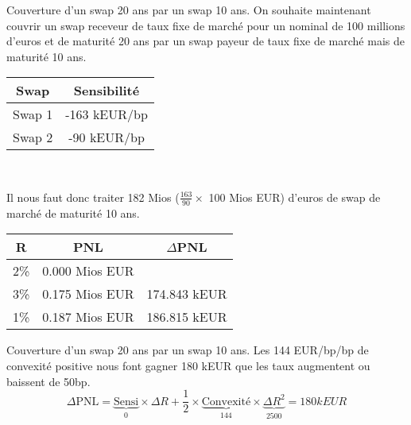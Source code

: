 \documentclass{beamer}
\begin{document}
\begin{frame}{Couverture d'un swap 20 ans par un swap 10 ans.}
On souhaite maintenant couvrir un swap receveur de taux fixe de marché pour un nominal de 100 millions d'euros et de maturité 20 ans par un swap payeur de taux fixe de marché mais de maturité 10 ans.\\
\begin{center}
\begin{tabular}{|c|c|}
\hline
Swap&Sensibilité \\ 
\hline
Swap 1 &-163 kEUR/bp \\ 
Swap 2 &-90 kEUR/bp \\ 
\hline
\end{tabular}\\
\end{center}
Il nous faut donc traiter 182 Mios ($\frac{163}{90} \times$ 100 Mios EUR)  d'euros de swap de marché de maturité 10 ans.
\begin{center}
\begin{tabular}{|c|c|c|}
\hline
R&PNL&$\Delta$PNL \\
\hline
2\% &0.000 Mios EUR& \\ 
3\% &0.175 Mios EUR&174.843 kEUR\\
1\% &0.187 Mios EUR&186.815 kEUR\\
\hline
\end{tabular}
\end{center}
\end{frame}
\begin{frame}{Couverture d'un swap 20 ans par un swap 10 ans.}
Les 144 EUR/bp/bp de convexité positive nous font gagner 180 kEUR que les taux augmentent ou baissent de 50bp.
\[
\Delta \text{PNL}=\underbrace{\text{Sensi}}_{0} \times \Delta R + \frac{1}{2} \times \underbrace{\text{Convexité}}_{144} \times \underbrace{\Delta R^2}_{2500}=180 kEUR
\]
\end{frame}
\end{document}
